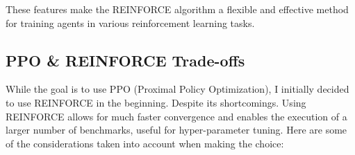 \begin{textblock}
These features make the REINFORCE algorithm a flexible and effective method for training agents in various reinforcement learning tasks.
\end{textblock}

\subsection{PPO \& REINFORCE Trade-offs }


\begin{textblock}
While the goal is to use PPO (Proximal Policy Optimization), I initially decided to use REINFORCE in the beginning. Despite its shortcomings. Using REINFORCE allows for much faster convergence and enables the execution of a larger number of benchmarks, useful for hyper-parameter tuning. Here are some of the considerations taken into account when making the choice:
\end{textblock}

